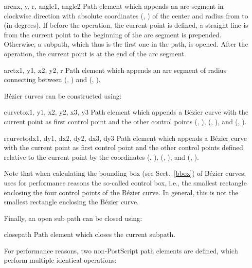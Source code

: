 \begin{classdesc}{arcn}{x, y, r, angle1, angle2}
Path element which appends an arc segment in clockwise direction
with absolute coordinates (, ) of the center and 
radius  from  to  (in degrees).
If before the operation, the current point is defined, a straight line
is from the current point to the beginning of the arc segment is
prepended. Otherwise, a subpath, which thus is the first one in the
path, is opened. After the operation, the current point is at the end
of the arc segment.
\end{classdesc}

\begin{classdesc}{arct}{x1, y1, x2, y2, r}
Path element which appends an arc segment of radius 
connecting between (, ) and (, ).\\
\end{classdesc}

B\'ezier curves can be constructed using: \

\begin{classdesc}{curveto}{x1, y1, x2, y2, x3, y3}
Path element which appends a B\'ezier curve with
the current point as first control point and the other control points
(, ), (, ), and (, ).
\end{classdesc}

\begin{classdesc}{rcurveto}{dx1, dy1, dx2, dy2, dx3, dy3}
Path element which appends a B\'ezier curve with
the current point as first control point and the other control points
defined relative to the current point by the coordinates
(, ), (, ), and (, ).
\end{classdesc}

Note that when calculating the bounding box (see Sect.~\ref{bbox}) of
B\'ezier curves, \PyX{} uses for performance reasons the so-called
control box, i.e., the smallest rectangle enclosing the four control
points of the B\'ezier curve. In general, this is not the smallest
rectangle enclosing the B\'ezier curve.

Finally, an open sub path can be closed using:

\begin{classdesc}{closepath}{}
Path element which closes the current subpath.
\end{classdesc}

For performance reasons, two non-PostScript path elements are defined, 
which perform multiple identical operations:

